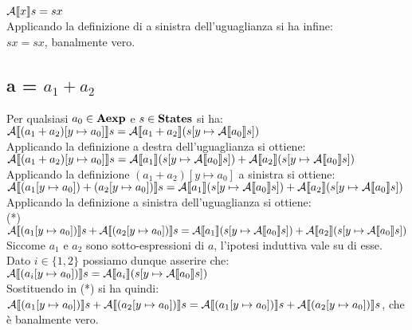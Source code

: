 {$\mathcal{A} \llbracket x \rrbracket s = s x$
\\

Applicando la definizione di  a sinistra dell'uguaglianza si ha infine:
\\

$s x = s x$,
banalmente vero.

\subsection{a = $a_1 + a_2$} Per qualsiasi $a_0 \in \textbf{Aexp}$ e $s \in \textbf{States}$ si
ha:
\\

$\mathcal{A} \llbracket (a_1 + a_2) [y \mapsto{} a_0] \rrbracket s =
\mathcal{A} \llbracket a_1 + a_2 \rrbracket (s [y \mapsto{} \mathcal{A} \llbracket a_0 \rrbracket s]) $
\\

Applicando la definizione  a destra dell'uguaglianza si ottiene:
\\

$\mathcal{A} \llbracket (a_1 + a_2) [y \mapsto{} a_0] \rrbracket s =
\mathcal{A} \llbracket a_1 \rrbracket (s [y \mapsto{} \mathcal{A} \llbracket a_0 \rrbracket s]) +
\mathcal{A} \llbracket a_2 \rrbracket (s [y \mapsto{} \mathcal{A} \llbracket a_0 \rrbracket s]) $
\\

Applicando la definizione $(a_1 + a_2)[y \mapsto{} a_0]$ a sinistra si ottiene:
\\

$\mathcal{A} \llbracket (a_1 [y \mapsto{} a_0]) + (a_2[y \mapsto{} a_0])  \rrbracket s =
\mathcal{A} \llbracket a_1 \rrbracket (s [y \mapsto{} \mathcal{A} \llbracket a_0 \rrbracket s]) +
\mathcal{A} \llbracket a_2 \rrbracket (s [y \mapsto{} \mathcal{A} \llbracket a_0 \rrbracket s]) $
\\

Applicando la definizione  a sinistra dell'uguaglianza si ottiene:
\\

(*) $\mathcal{A} \llbracket (a_1 [y \mapsto{} a_0]) \rrbracket s + \mathcal{A} \llbracket (a_2[y \mapsto{} a_0]) \rrbracket s =
\mathcal{A} \llbracket a_1 \rrbracket (s [y \mapsto{} \mathcal{A} \llbracket a_0 \rrbracket s]) +
\mathcal{A} \llbracket a_2 \rrbracket (s [y \mapsto{} \mathcal{A} \llbracket a_0 \rrbracket s]) $
\\

Siccome $a_1$ e $a_2$ sono sotto-espressioni di $a$, l'ipotesi induttiva vale
su di esse. Dato $i \in{} \{1, 2\}$ possiamo dunque asserire che:
\\

$\mathcal{A} \llbracket (a_i [y \mapsto{} a_0]) \rrbracket s =
\mathcal{A} \llbracket a_i \rrbracket (s [y \mapsto{} \mathcal{A} \llbracket a_0 \rrbracket s])$
\\

Sostituendo in (*) si ha quindi:
\\

$\mathcal{A} \llbracket (a_1 [y \mapsto{} a_0]) \rrbracket s + \mathcal{A} \llbracket (a_2[y \mapsto{} a_0])  \rrbracket s =
 \mathcal{A} \llbracket (a_1 [y \mapsto{} a_0]) \rrbracket s + \mathcal{A} \llbracket (a_2[y \mapsto{} a_0])  \rrbracket s$,
 che è banalmente vero.

}

